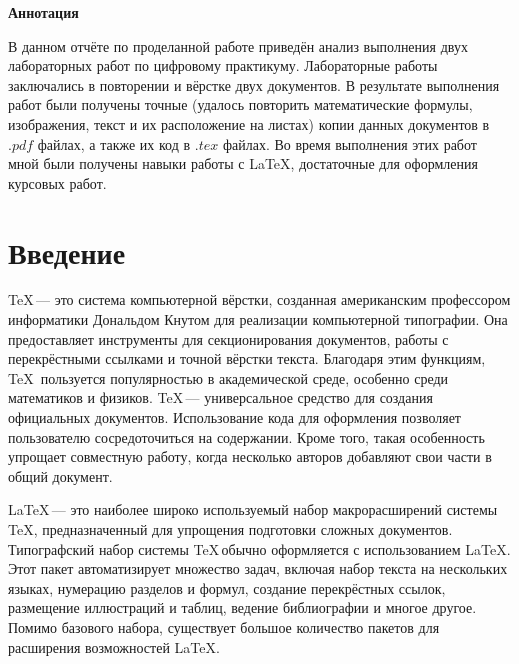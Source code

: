 \documentclass[a4paper, final]{article}
\begin{document}
{
\begin{center}
    {\large\bf Аннотация}
\end{center}

В данном отчёте по проделанной работе приведён анализ выполнения двух  
лабораторных работ по цифровому практикуму. Лабораторные работы заключались  
в повторении и вёрстке двух документов. В результате выполнения работ были  
получены точные (удалось повторить математические формулы, изображения, текст  
и их расположение на листах) копии данных документов в $.pdf$ файлах, а также  
их код в $.tex$ файлах. Во время выполнения этих работ мной были получены навыки  
работы с \LaTeX{}, достаточные для оформления курсовых работ.  

\newpage
}




\tableofcontents
\newpage
    
    


{
\section*{Введение}

\TeX \,— это система компьютерной вёрстки, созданная американским профессором информатики Дональдом Кнутом для реализации компьютерной типографии. Она предоставляет инструменты для секционирования документов, работы с перекрёстными ссылками и точной вёрстки текста. Благодаря этим функциям, \TeX \, пользуется популярностью в академической среде, особенно среди математиков и физиков.
\TeX \,— универсальное средство для создания официальных документов. Использование кода для оформления позволяет пользователю сосредоточиться на содержании. Кроме того, такая особенность упрощает совместную работу, когда несколько авторов добавляют свои части в общий документ.

\LaTeX \,— это наиболее широко используемый набор макрорасширений системы \TeX, предназначенный для упрощения подготовки сложных документов. Типографский набор системы \TeX \,обычно оформляется с использованием \LaTeX. Этот пакет автоматизирует множество задач, включая набор текста на нескольких языках, нумерацию разделов и формул, создание перекрёстных ссылок, размещение иллюстраций и таблиц, ведение библиографии и многое другое. Помимо базового набора, существует большое количество пакетов для расширения возможностей \LaTeX.\cite{wayne-uni:What are LaTeX Packages?}

\newpage
}
\end{document}
